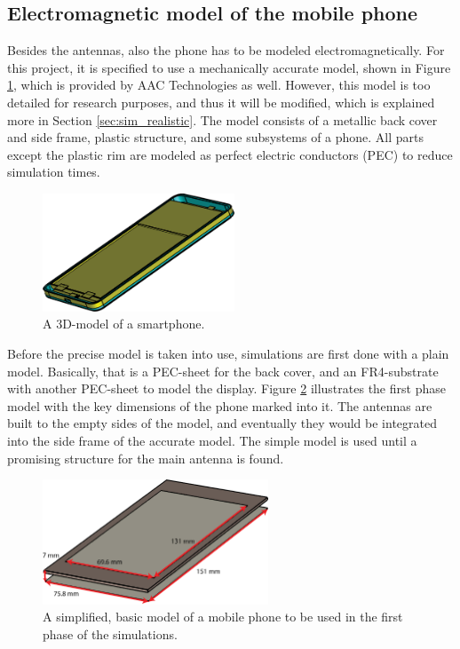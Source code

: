 \vspace{-15pt}
\subsection{Electromagnetic model of the mobile phone}
\label{sec:phone}
Besides the antennas, also the phone has to be modeled electromagnetically. For this project, it is specified to use a mechanically accurate model, shown in Figure \ref{fig:cad}, which is provided by AAC Technologies as well. However, this model is too detailed for research purposes, and thus it will be modified, which is explained more in Section \ref{sec:sim_realistic}. The model consists of a metallic back cover and side frame, plastic structure, and some subsystems of a phone. All parts except the plastic rim are modeled as perfect electric conductors (PEC) to reduce simulation times.

\begin{figure}[H]
    \vspace{-7pt}
    \centering
    \includegraphics[width=0.51\textwidth]{img/cad.eps}
    \caption{A 3D-model of a smartphone.}
    \label{fig:cad}
\end{figure}

Before the precise model is taken into use, simulations are first done with a plain model. Basically, that is a PEC-sheet for the back cover, and an FR4-substrate with another PEC-sheet to model the display. Figure \ref{fig:basic_structure} illustrates the first phase model with the key dimensions of the phone marked into it. The antennas are built to the empty sides of the model, and eventually they would be integrated into the side frame of the accurate model. The simple model is used until a promising structure for the main antenna is found. 
\begin{figure}[H]
    \centering
    \includegraphics[width=0.6\textwidth]{img/basic_structure.eps}
    \caption{A simplified, basic model of a mobile phone to be used in the first phase of the simulations.}
    \label{fig:basic_structure}
\end{figure}

